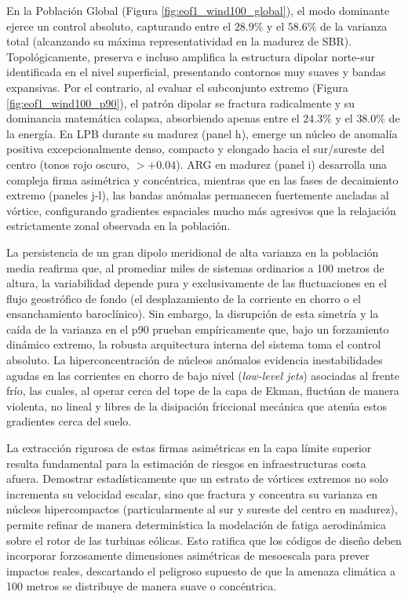 En la Población Global (Figura \ref{fig:eof1_wind100_global}), el modo dominante ejerce un control absoluto, capturando entre el $28.9\%$ y el $58.6\%$ de la varianza total (alcanzando su máxima representatividad en la madurez de SBR). Topológicamente, preserva e incluso amplifica la estructura dipolar norte-sur identificada en el nivel superficial, presentando contornos muy suaves y bandas expansivas. Por el contrario, al evaluar el subconjunto extremo (Figura \ref{fig:eof1_wind100_p90}), el patrón dipolar se fractura radicalmente y su dominancia matemática colapsa, absorbiendo apenas entre el $24.3\%$ y el $38.0\%$ de la energía. En LPB durante su madurez (panel h), emerge un núcleo de anomalía positiva excepcionalmente denso, compacto y elongado hacia el sur/sureste del centro (tonos rojo oscuro, $>+0.04$). ARG en madurez (panel i) desarrolla una compleja firma asimétrica y concéntrica, mientras que en las fases de decaimiento extremo (paneles j-l), las bandas anómalas permanecen fuertemente ancladas al vórtice, configurando gradientes espaciales mucho más agresivos que la relajación estrictamente zonal observada en la población.

La persistencia de un gran dipolo meridional de alta varianza en la población media reafirma que, al promediar miles de sistemas ordinarios a 100 metros de altura, la variabilidad depende pura y exclusivamente de las fluctuaciones en el flujo geostrófico de fondo (el desplazamiento de la corriente en chorro o el ensanchamiento baroclínico). Sin embargo, la disrupción de esta simetría y la caída de la varianza en el p90 prueban empíricamente que, bajo un forzamiento dinámico extremo, la robusta arquitectura interna del sistema toma el control absoluto. La hiperconcentración de núcleos anómalos evidencia inestabilidades agudas en las corrientes en chorro de bajo nivel (\textit{low-level jets}) asociadas al frente frío, las cuales, al operar cerca del tope de la capa de Ekman, fluctúan de manera violenta, no lineal y libres de la disipación friccional mecánica que atenúa estos gradientes cerca del suelo.

La extracción rigurosa de estas firmas asimétricas en la capa límite superior resulta fundamental para la estimación de riesgos en infraestructuras costa afuera. Demostrar estadísticamente que un estrato de vórtices extremos no solo incrementa su velocidad escalar, sino que fractura y concentra su varianza en núcleos hipercompactos (particularmente al sur y sureste del centro en madurez), permite refinar de manera determinística la modelación de fatiga aerodinámica sobre el rotor de las turbinas eólicas. Esto ratifica que los códigos de diseño deben incorporar forzosamente dimensiones asimétricas de mesoescala para prever impactos reales, descartando el peligroso supuesto de que la amenaza climática a 100 metros se distribuye de manera suave o concéntrica.

